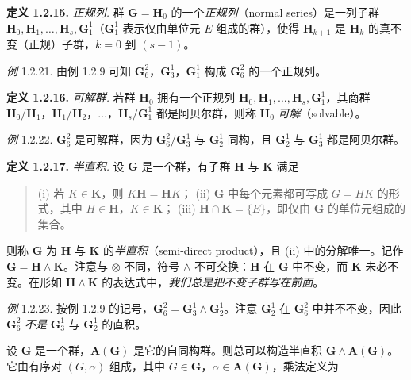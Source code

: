 \textbf{定义 1.2.15.} \textit{正规列.} 群 $\mathbf{G} = \mathbf{H}_{0}$ 的一个\textit{正规列}（normal series）是一列子群 $\mathbf{H}_{0}, \mathbf{H}_{1}, \ldots, \mathbf{H}_{s}, \mathbf{G}_1^1$（$\mathbf{G}_1^1$ 表示仅由单位元 $E$ 组成的群），使得 $\mathbf{H}_{k+1}$ 是 $\mathbf{H}_{k}$ 的真不变（正规）子群，$k = 0$ 到 $(s-1)$。

\textit{例} 1.2.21. 由例 1.2.9 可知 $\mathbf{G}_6^2$，$\mathbf{G}_3^1$，$\mathbf{G}_1^1$ 构成 $\mathbf{G}_6^2$ 的一个正规列。

\textbf{定义 1.2.16.} \textit{可解群.} 若群 $\mathbf{H}_{0}$ 拥有一个正规列 $\mathbf{H}_{0}, \mathbf{H}_{1}, \ldots, \mathbf{H}_{s}, \mathbf{G}_1^1$，其商群 $\mathbf{H}_{0}/\mathbf{H}_{1}$，$\mathbf{H}_{1}/\mathbf{H}_{2}$，$\ldots$，$\mathbf{H}_{s}/\mathbf{G}_1^1$ 都是阿贝尔群，则称 $\mathbf{H}_{0}$ \textit{可解}（solvable）。

\textit{例} 1.2.22. $\mathbf{G}_6^2$ 是可解群，因为 $\mathbf{G}_6^2/\mathbf{G}_3^1$ 与 $\mathbf{G}_2^1$ 同构，且 $\mathbf{G}_2^1$ 与 $\mathbf{G}_3^1$ 都是阿贝尔群。

\textbf{定义 1.2.17.} \textit{半直积.} 设 $\mathbf{G}$ 是一个群，有子群 $\mathbf{H}$ 与 $\mathbf{K}$ 满足

\begin{quote}
(i) 若 $K \in \mathbf{K}$，则 $K\mathbf{H} = \mathbf{H}K$；
(ii) $\mathbf{G}$ 中每个元素都可写成 $G = HK$ 的形式，其中 $H \in \mathbf{H}$，$K \in \mathbf{K}$；
(iii) $\mathbf{H} \cap \mathbf{K} = \{E\}$，即仅由 $\mathbf{G}$ 的单位元组成的集合。
\end{quote}

则称 $\mathbf{G}$ 为 $\mathbf{H}$ 与 $\mathbf{K}$ 的\textit{半直积}（semi-direct product），且 (ii) 中的分解唯一。记作 $\mathbf{G} = \mathbf{H} \wedge \mathbf{K}$。注意与 $\otimes$ 不同，符号 $\wedge$ 不可交换：$\mathbf{H}$ 在 $\mathbf{G}$ 中不变，而 $\mathbf{K}$ 未必不变。在形如 $\mathbf{H} \wedge \mathbf{K}$ 的表达式中，\textit{我们总是把不变子群写在前面}。

\textit{例} 1.2.23. 按例 1.2.9 的记号，$\mathbf{G}_6^2 = \mathbf{G}_3^1 \wedge \mathbf{G}_2^1$。注意 $\mathbf{G}_2^1$ 在 $\mathbf{G}_6^2$ 中并不不变，因此 $\mathbf{G}_6^2$ \textit{不是} $\mathbf{G}_3^1$ 与 $\mathbf{G}_2^1$ 的直积。

设 $\mathbf{G}$ 是一个群，$\mathbf{A}(\mathbf{G})$ 是它的自同构群。则总可以构造半直积 $\mathbf{G} \wedge \mathbf{A}(\mathbf{G})$。它由有序对 $(G, \alpha)$ 组成，其中 $G \in \mathbf{G}$，$\alpha \in \mathbf{A}(\mathbf{G})$，乘法定义为

